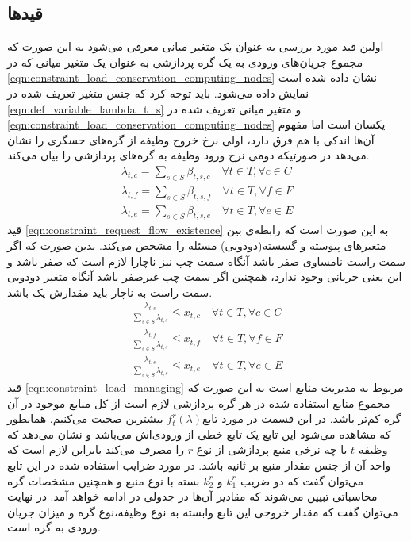     \subsection{قیدها}
    اولین قید مورد بررسی به عنوان یک متغیر میانی معرفی می‌شود به این صورت که مجموع جریان‌های ورودی به یک گره پردازشی به عنوان یک متغیر میانی که در \cref{eqn:constraint_load_conservation_computing_nodes} نشان داده شده است نمایش داده می‌شود. باید توجه کرد که جنس متغیر تعریف شده در \cref{eqn:def_variable_lambda_t_s} و متغیر میانی تعریف شده در \cref{eqn:constraint_load_conservation_computing_nodes} یکسان است اما مفهوم آن‌ها اندکی با هم فرق دارد، اولی نرخ خروج وظیفه از گره‌های حسگری را نشان می‌دهد در صورتیکه دومی نرخ ورود وظیفه به گره‌های پردازشی را بیان می‌کند. 
    \begin{subequations}\label{eqn:constraint_load_conservation_computing_nodes}
    	\begin{align}
    	\lambda_{t,c} = \sum_{s\in S}\beta_{t,s,c} \quad \forall{t \in T}, \forall{c \in C} \\
    	\lambda_{t,f} = \sum_{s\in S}\beta_{t,s,f} \quad \forall{t \in T}, \forall{f \in F} \\
    	\lambda_{t,e} = \sum_{s\in S}\beta_{t,s,e} \quad \forall{t \in T}, \forall{e \in E}
    	\end{align}
    \end{subequations}
	قید \cref{eqn:constraint_request_flow_existence} به این صورت است که رابطه‌ی بین متغیرهای پیوسته و گسسته(دودویی) مسئله را مشخص می‌کند. بدین صورت که اگر سمت راست نامساوی صفر باشد آنگاه سمت چپ نیز ناچارا لازم است که صفر باشد و این یعنی جریانی وجود ندارد، همچنین اگر سمت چپ غیرصفر باشد آنگاه متغیر دودویی سمت راست به ناچار باید مقدارش یک باشد. 
	\begin{subequations}\label{eqn:constraint_request_flow_existence}
		\begin{align}
		\frac{\lambda_{t,c}}{\sum_{s\in S}\lambda_{t,s}} \le x_{t,c} \quad \forall{t \in T}, \forall{c \in C} \\
		\frac{\lambda_{t,f}}{\sum_{s\in S}\lambda_{t,s}} \le x_{t,f} \quad \forall{t \in T}, \forall{f \in F} \\
		\frac{\lambda_{t,e}}{\sum_{s\in S}\lambda_{t,s}} \le x_{t,e} \quad \forall{t \in T}, \forall{e \in E}
		\end{align}
	\end{subequations}
	قید \cref{eqn:constraint_load_managing} مربوط به مدیریت منابع است به این‌ صورت که مجموع منابع استفاده شده در هر گره پردازشی لازم است از کل منابع موجود در آن گره کم‌تر باشد. در این قسمت در مورد تابع$f_t^r(\lambda)$ بیشترین صحبت می‌کنیم. همانطور که مشاهده می‌شود این تابع یک تابع خطی از ورودی‌اش می‌باشد و نشان می‌دهد که وظیفه $t$ با چه نرخی منبع پردازشی از نوع $r$ را مصرف می‌کند بابراین لازم است که واحد آن از جنس مقدار منبع بر ثانیه باشد. در مورد ضرایب استفاده شده در این تابع می‌توان گفت که دو ضریب $k_1^r$ و $k_2^r$ بسته با نوع منبع و همچنین مشخصات گره محاسباتی تبیین می‌شوند که مقادیر آن‌ها در جدولی در ادامه خواهد آمد. در نهایت می‌توان گفت که مقدار خروجی این تابع وابسته به نوع وظیفه،نوع گره و میزان جریان ورودی به گره است. 
